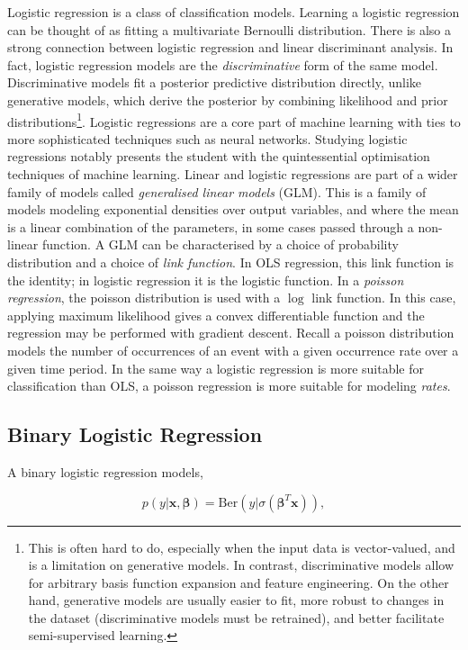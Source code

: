 \documentclass[11pt]{amsart}
\begin{document}
Logistic regression is a class of classification models. Learning a logistic regression can be thought of as fitting a multivariate Bernoulli distribution. There is also a strong connection between logistic regression and linear discriminant analysis. In fact, logistic regression models are the \emph{discriminative} form of the same model. Discriminative models fit a posterior predictive distribution directly, unlike generative models, which derive the posterior by combining likelihood and prior distributions\footnote{This is often hard to do, especially when the input data is vector-valued, and is a limitation on generative models. In contrast, discriminative models allow for arbitrary basis function expansion and feature engineering. On the other hand, generative models are usually easier to fit, more robust to changes in the dataset (discriminative models must be retrained), and better facilitate semi-supervised learning.}. Logistic regressions are a core part of machine learning with ties to more sophisticated techniques such as neural networks. Studying logistic regressions notably presents the student with the quintessential optimisation techniques of machine learning. Linear and logistic regressions are part of a wider family of models called \emph{generalised linear models} (GLM). This is a family of models modeling exponential densities over output variables, and where the mean is a linear combination of the parameters, in some cases passed through a non-linear function. A GLM can be characterised by a choice of probability distribution and a choice of \emph{link function}. In OLS regression, this link function is the identity; in logistic regression it is the logistic function. In a \emph{poisson regression}, the poisson distribution is used with a $\log$ link function. In this case, applying maximum likelihood gives a convex differentiable function and the regression may be performed with gradient descent. Recall a poisson distribution models the number of occurrences of an event with a given occurrence rate over a given time period. In the same way a logistic regression is more suitable for classification than OLS, a poisson regression is more suitable for modeling \emph{rates}.

\subsection{Binary Logistic Regression}

A binary logistic regression models,

$$p(y|\mathbf{x}, \boldsymbol\beta) = \text{Ber}(y|\sigma(\boldsymbol\beta^T\mathbf{x})),$$
\end{document}
